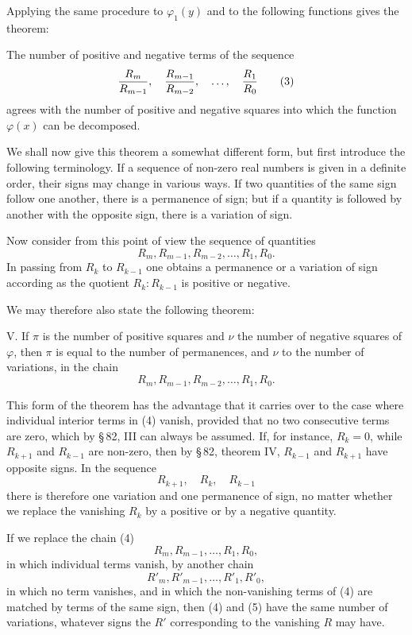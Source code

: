 \documentclass[11pt]{article}
\begin{document}
Applying the same procedure to $\varphi_1(y)$ and to the following functions gives the theorem:

The number of positive and negative terms of the sequence
\begin{equation}
        {R_m\over R_{m-1}},\quad {R_{m-1}\over R_{m-2}},\quad \ldots,\quad {R_1\over R_0}
\tag{3}
\end{equation}
agrees with the number of positive and negative squares into which the function $\varphi(x)$ can be decomposed.

We shall now give this theorem a somewhat different form, but first introduce the following terminology. If a sequence of non-zero real numbers is given in a definite order, their signs may change in various ways. If two quantities of the same sign follow one another, there is a permanence of sign; but if a quantity is followed by another with the opposite sign, there is a variation of sign.

Now consider from this point of view the sequence of quantities
\[
        R_m,
        R_{m-1},
        R_{m-2},
        \ldots,
        R_1,
        R_0.
\]
In passing from $R_k$ to $R_{k-1}$ one obtains a permanence or a variation of sign according as the quotient $R_k:R_{k-1}$ is positive or negative.

We may therefore also state the following theorem:

V. If $\pi$ is the number of positive squares and $\nu$ the number of negative squares of $\varphi$, then $\pi$ is equal to the number of permanences, and $\nu$ to the number of variations, in the chain
\begin{equation}
        R_m,
        R_{m-1},
        R_{m-2},
        \ldots,
        R_1,
        R_0.
\tag{4}
\end{equation}

This form of the theorem has the advantage that it carries over to the case where individual interior terms in (4) vanish, provided that no two consecutive terms are zero, which by \S\,82, III can always be assumed. If, for instance, $R_k=0$, while $R_{k+1}$ and $R_{k-1}$ are non-zero, then by \S\,82, theorem IV, $R_{k-1}$ and $R_{k+1}$ have opposite signs. In the sequence
\[
        R_{k+1},\quad R_k,
\quad R_{k-1}
\]
there is therefore one variation and one permanence of sign, no matter whether we replace the vanishing $R_k$ by a positive or by a negative quantity.

If we replace the chain (4)
\[
        R_m,
        R_{m-1},
        \ldots,R_1,R_0,
\]
in which individual terms vanish, by another chain
\begin{equation}
        R'_m,
        R'_{m-1},
        \ldots,R'_1,R'_0,
\tag{5}
\end{equation}
in which no term vanishes, and in which the non-vanishing terms of (4) are matched by terms of the same sign, then (4) and (5) have the same number of variations, whatever signs the $R'$ corresponding to the vanishing $R$ may have.
\end{document}
